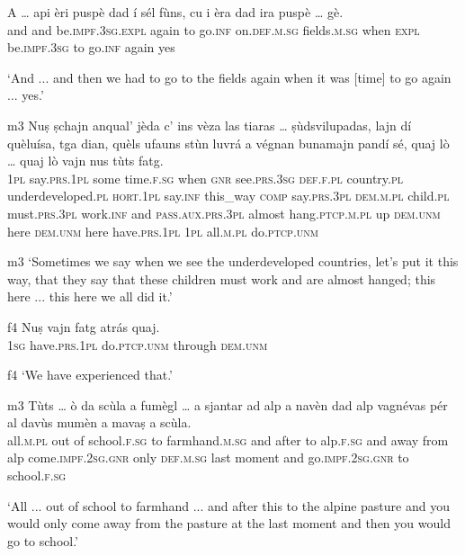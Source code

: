 \begin{linenumbers}
	\gll A … api èri puspè dad í sél fùns, cu i èra dad ira puspè … gè.\\
	and {} and be.\textsc{impf.3sg.expl} again to go.\textsc{inf} on.\textsc{def.m.sg} fields.\textsc{m.sg} when \textsc{expl} be.\textsc{impf.3sg} to go.\textsc{inf} again {} yes\\
\end{linenumbers}
\medskip
\glt `And ... and then we had to go to the fields again when it was [time] to go again ... yes.'
\medskip

\begin{linenumbers}
	\gll {\ob}m3{\cb} Nuṣ ṣchajn anqual’ jèda c’ ins vèza las tiaras … ṣùdsvilupadas, lajn dí quèluísa, tga dian, quèls ufauns stùn luvrá a végnan bunamajn pandí sé, quaj lò … quaj lò vajn nus tùts fatg.\\
{} \textsc{1pl} say.\textsc{prs.1pl} some time.\textsc{f.sg} when \textsc{gnr} see.\textsc{prs.3sg} \textsc{def.f.pl} country.\textsc{pl} {} underdeveloped.\textsc{pl} \textsc{hort.1pl} say.\textsc{inf} this\_way \textsc{comp} say.\textsc{prs.3pl} \textsc{dem.m.pl} child.\textsc{pl} must.\textsc{prs.3pl} work.\textsc{inf} and \textsc{pass.aux.prs.3pl} almost hang.\textsc{ptcp.m.pl} up \textsc{dem.unm} here {} \textsc{dem.unm} here have.\textsc{prs.1pl} \textsc{1pl} all.\textsc{m.pl} do.\textsc{ptcp.unm}	\\
\end{linenumbers}
\medskip
\glt {\ob}m3{\cb} `Sometimes we say when we see the underdeveloped countries, let's put it this way, that they say that these children must work and are almost hanged; this here ... this here we all did it.'
\medskip

\begin{linenumbers}
	\gll {\ob}f4{\cb} Nuṣ vajn fatg atrás quaj.\\
	{} \textsc{1sg} have.\textsc{prs.1pl} do\textsc{.ptcp.unm} through \textsc{dem.unm}\\
\end{linenumbers}
\medskip
\glt {\ob}f4{\cb} `We have experienced that.'
\medskip

\begin{linenumbers}
	\gll  {\ob}m3{\cb} Tùts … ò da scùla a fumègl … a sjantar ad alp a navèn dad alp vagnévas pér al davùs mumèn a mavaṣ a scùla. \\
{}	all.\textsc{m.pl} {} out of school.\textsc{f.sg} to farmhand.\textsc{m.sg} {} and after to alp.\textsc{f.sg} and away from alp come.\textsc{impf.2sg.gnr} only \textsc{def.m.sg} last moment and go.\textsc{impf.2sg.gnr} to school.\textsc{f.sg}\\
\end{linenumbers}
\medskip
\glt `All ... out of school to farmhand ... and after this to the alpine pasture and you would only come away from the pasture at the last moment and then you would go to school.'
\medskip


